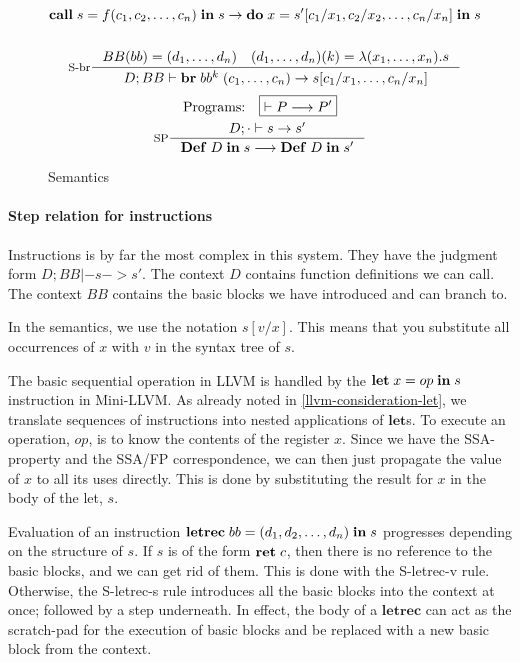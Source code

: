 \documentclass[a4paper, oneside, 10pt, draft]{memoir}
\begin{document}
\begin{figure}
\begin{gather*}
{      \icall{s}{f}{(c_1, c_2, \dotsc, c_n)}{s} -> \ido{x}{s'[c_1/x_1, c_2/x_2,
        \dotsc, c_n/x_n]}{s}}\\\\
    \inference[S-br]{BB(bb) = (d_1,\dotsc,d_n) \quad (d_1,\dotsc,d_n)(k) = \lambda(x_1, \dotsc,
      x_n).s}{D;BB |- \ibr{bb^k}{(c_1, \dotsc, c_n)} -> s[c_1/x_1, \dotsc, c_n/x_n]}
 \end{gather*}
 \begin{gather*}
   \text{Programs:} \quad \boxed{|- P --> P'}\\
   \inference[SP]{D;\cdot |- s -> s'}{\ipgm{D}{s} --> \ipgm{D}{s'}}
 \end{gather*}
  \caption{Semantics}
  \label{fig:semantics}
\end{figure}

\paragraph{Step relation for instructions}

Instructions is by far the most complex in this system. They have the
judgment form $\boxed{D;BB |- s -> s'}$. The context $D$
contains function definitions we can call. The context $BB$ contains
the basic blocks we have introduced and can branch to.

In the semantics, we use the notation $s[v/x]$. This means that you
substitute all occurrences of $x$ with $v$ in the syntax tree of
$s$.

The basic sequential operation in LLVM is handled by the
$\mathbf{let} \; x = op \; \mathbf{in} \; s$ instruction in Mini-LLVM. As already noted in
\ref{llvm-consideration-let}, we translate sequences of instructions
into nested applications of $\mathbf{let}$s. To execute an operation,
$op$, is to know the contents of the register $x$. Since we have the
SSA-property and the SSA/FP correspondence, we can then just propagate
the value of $x$ to all its uses directly. This is done by
substituting the result for $x$ in the body of the let, $s$.

Evaluation of an instruction $\mathbf{letrec} \; bb = (d_1, d_2, \dotsc, d_n) \; \mathbf{in} \; s$ progresses
depending on the structure of $s$. If $s$ is of the form $\mathbf{ret} \; c$,
then there is no reference to the basic blocks, and we can get rid of
them. This is done with the S-letrec-v rule. Otherwise, the S-letrec-s
rule introduces all the basic blocks into the context at once;
followed by a step underneath.  In effect, the body of a
$\mathbf{letrec}$ can act as the scratch-pad for the execution of
basic blocks and be replaced with a new basic block from the context.
\end{document}
